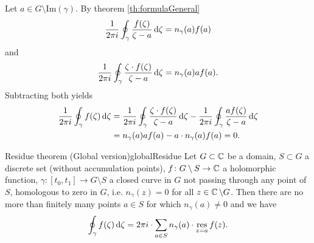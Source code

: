 \documentclass[a4paper,english]{article}
\begin{document}
\begin{pr}
    Let $a \in G \setminus \text{Im}(\gamma)$.
    By theorem \ref{th:formulaGeneral}
    \begin{equation*}
        \frac{1}{2 \pi i} \oint_{\gamma} \frac{f(\zeta)}{\zeta - a} \mathop{}\!\mathrm{d}{\zeta}
        = n_{\gamma}(a) f(a)
    \end{equation*}
    and
    \begin{equation*}
        \frac{1}{2 \pi i} \oint_{\gamma} \frac{\zeta \cdot f(\zeta)}{\zeta - a} \mathop{}\!\mathrm{d}{\zeta}
        = n_{\gamma}(a) a f(a).
    \end{equation*}
    Subtracting both yields
    \begin{align*}
        \frac{1}{2 \pi i} \oint_{\gamma} f(\zeta) \mathop{}\!\mathrm{d}{\zeta}
        & = \frac{1}{2 \pi i} \oint_{\gamma} \frac{\zeta \cdot f(\zeta)}{\zeta - a} \mathop{}\!\mathrm{d}{\zeta} - \frac{1}{2 \pi i} \oint_{\gamma} \frac{a f(\zeta)}{\zeta - a} \mathop{}\!\mathrm{d}{\zeta} \\
        & = n_{\gamma}(a) a f(a) - a \cdot n_{\gamma}(a) f(a)
        = 0.
    \end{align*}
\end{pr}

\begin{thm}{Residue theorem (Global version)}{globalResidue}
    Let $G \subset \operatorname{\mathbb{C}}$ be a domain, $S \subset G$ a discrete set (without accumulation points), $f \colon G \setminus S \to \operatorname{\mathbb{C}}$ a holomorphic function, $\gamma \colon [t_0, t_1] \to G \setminus S$ a closed curve in $G$ not passing through any point of $S$, homologous to zero in $G$, i.e. $n_{\gamma}(z) = 0$ for all $z \in \operatorname{\mathbb{C}} \setminus G$.
    Then there are no more than finitely many points $a \in S$ for which $n_{\gamma}(a) \ne 0$ and we have
    \begin{equation*}
        \oint_{\gamma} f(\zeta) \mathop{}\!\mathrm{d}{\zeta}
        = 2 \pi i \cdot \sum_{a \in S} n_{\gamma}(a) \cdot \operatorname*{res}_{z = a} f(z).
    \end{equation*}
\end{thm}
\end{document}
